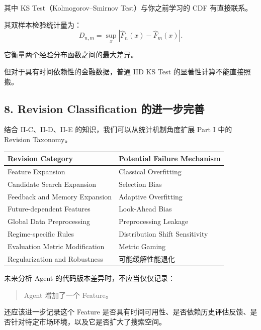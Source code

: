 其中 KS Test（Kolmogorov--Smirnov Test）与你之前学习的 CDF 有直接联系。

其双样本检验统计量为：
\[D_{n,m}
=
\sup_x
|\widehat F_n(x)-\widehat F_m(x)|.\]

它衡量两个经验分布函数之间的最大差异。

但对于具有时间依赖性的金融数据，普通 IID KS Test 的显著性计算不能直接照搬。

\hypertarget{part-2-23-0001-revision-classification-ux7684ux8fdbux4e00ux6b65ux5b8cux5584}{%
\subsection{8. Revision Classification 的进一步完善}\label{part-2-23-0001-revision-classification-ux7684ux8fdbux4e00ux6b65ux5b8cux5584}}

结合 II-C、II-D、II-E 的知识，我们可以从统计机制角度扩展 Part I 中的 Revision Taxonomy。

\begin{readertable}
\begin{longtable}[]{@{}
  >{\raggedright\arraybackslash}p{}
  >{\raggedright\arraybackslash}p{}@{}}
\toprule
Revision Category & Potential Failure Mechanism \\
\midrule
\endhead
Feature Expansion & Classical Overfitting \\
Candidate Search Expansion & Selection Bias \\
Feedback and Memory Expansion & Adaptive Overfitting \\
Future-dependent Features & Look-Ahead Bias \\
Global Data Preprocessing & Preprocessing Leakage \\
Regime-specific Rules & Distribution Shift Sensitivity \\
Evaluation Metric Modification & Metric Gaming \\
Regularization and Robustness & 可能缓解性能退化 \\
\bottomrule
\end{longtable}
\end{readertable}

未来分析 Agent 的代码版本差异时，不应当仅仅记录：

\begin{quote}
Agent 增加了一个 Feature。
\end{quote}

还应该进一步记录这个 Feature 是否具有时间可用性、是否依赖历史评估反馈、是否针对特定市场环境，以及它是否扩大了搜索空间。

